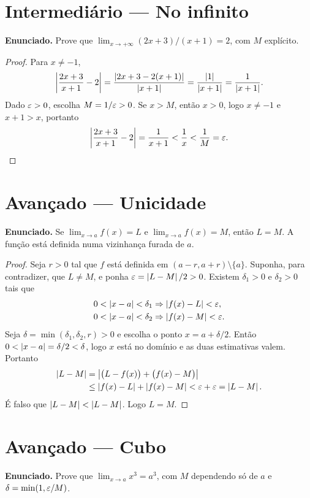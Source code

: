 \documentclass[11pt,a4paper]{article}
\begin{document}
\section{Intermedi\'ario --- No infinito}

\textbf{Enunciado.} Prove que $\lim_{x\to +\infty}(2x+3)/(x+1)=2$, com $M$ expl\'icito.

\begin{proof}
Para $x\neq -1$,
\[
\left\lvert \frac{2x+3}{x+1}-2 \right\rvert=\frac{\left\lvert 2x+3-2(x+1) \right\rvert}{\left\lvert x+1 \right\rvert}=\frac{\left\lvert 1 \right\rvert}{\left\lvert x+1 \right\rvert}=\frac{1}{\left\lvert x+1 \right\rvert}.
\]
Dado $\varepsilon>0$, escolha $M=1/\varepsilon>0$. Se $x>M$, ent\~ao $x>0$, logo $x\neq -1$ e $x+1>x$, portanto
\[
\left\lvert \frac{2x+3}{x+1}-2 \right\rvert=\frac{1}{x+1}<\frac{1}{x}<\frac{1}{M}=\varepsilon.
\]
\end{proof}

\section{Avan\c{c}ado --- Unicidade}

\textbf{Enunciado.} Se $\lim_{x\to a}f(x)=L$ e $\lim_{x\to a}f(x)=M$, ent\~ao $L=M$. A fun\c{c}\~ao est\'a definida numa vizinhan\c{c}a furada de $a$.

\begin{proof}
Seja $r>0$ tal que $f$ est\'a definida em $(a-r,a+r)\setminus\{a\}$. Suponha, para contradizer, que $L\neq M$, e ponha $\varepsilon=\left\lvert L-M \right\rvert/2>0$. Existem $\delta_1>0$ e $\delta_2>0$ tais que
\begin{align*}
0<\left\lvert x-a \right\rvert<\delta_1 &\Rightarrow \left\lvert f(x)-L \right\rvert<\varepsilon,\\
0<\left\lvert x-a \right\rvert<\delta_2 &\Rightarrow \left\lvert f(x)-M \right\rvert<\varepsilon.
\end{align*}
Seja $\delta=\min(\delta_1,\delta_2,r)>0$ e escolha o ponto $x=a+\delta/2$. Ent\~ao $0<\left\lvert x-a \right\rvert=\delta/2<\delta$, logo $x$ est\'a no dom\'inio e as duas estimativas valem. Portanto
\begin{align*}
\left\lvert L-M \right\rvert
&=\left\lvert \bigl(L-f(x)\bigr)+\bigl(f(x)-M\bigr) \right\rvert\\
&\le \left\lvert f(x)-L \right\rvert+\left\lvert f(x)-M \right\rvert
<\varepsilon+\varepsilon
=\left\lvert L-M \right\rvert.
\end{align*}
\'E falso que $\left\lvert L-M \right\rvert<\left\lvert L-M \right\rvert$. Logo $L=M$.
\end{proof}

\section{Avan\c{c}ado --- Cubo}

\textbf{Enunciado.} Prove que $\lim_{x\to a}x^3=a^3$, com $M$ dependendo s\'o de $a$ e $\delta=\min(1,\varepsilon/M)$.
\end{document}

